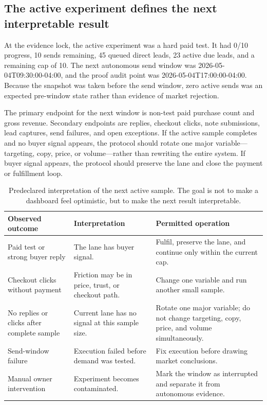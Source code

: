 \documentclass[12pt,letterpaper]{article}
\begin{document}
\subsection{The active experiment defines the next interpretable result}

At the evidence lock, the active experiment was a hard paid test. It had 0/10 progress, 10 sends remaining, 45 queued direct leads, 23 active due leads, and a remaining cap of 10. The next autonomous send window was 2026-05-04T09:30:00-04:00, and the proof audit point was 2026-05-04T17:00:00-04:00. Because the snapshot was taken before the send window, zero active sends was an expected pre-window state rather than evidence of market rejection.

The primary endpoint for the next window is non-test paid purchase count and gross revenue. Secondary endpoints are replies, checkout clicks, note submissions, lead captures, send failures, and open exceptions. If the active sample completes and no buyer signal appears, the protocol should rotate one major variable---targeting, copy, price, or volume---rather than rewriting the entire system. If buyer signal appears, the protocol should preserve the lane and close the payment or fulfillment loop.

\begin{table}[tbp]
\centering
\small
\caption{Predeclared interpretation of the next active sample. The goal is not to make a dashboard feel optimistic, but to make the next result interpretable.}
\label{tab:active_sample}
\begin{tabularx}{\textwidth}{L{0.25\textwidth}Y Y}
\toprule
{}
\textbf{Observed outcome} & \textbf{Interpretation} & \textbf{Permitted operation} \\
\midrule
Paid test or strong buyer reply & The lane has buyer signal. & Fulfil, preserve the lane, and continue only within the current cap. \\
Checkout clicks without payment & Friction may be in price, trust, or checkout path. & Change one variable and run another small sample. \\
No replies or clicks after complete sample & Current lane has no signal at this sample size. & Rotate one major variable; do not change targeting, copy, price, and volume simultaneously. \\
Send-window failure & Execution failed before demand was tested. & Fix execution before drawing market conclusions. \\
Manual owner intervention & Experiment becomes contaminated. & Mark the window as interrupted and separate it from autonomous evidence. \\
\bottomrule
\end{tabularx}
\end{table}
\end{document}
